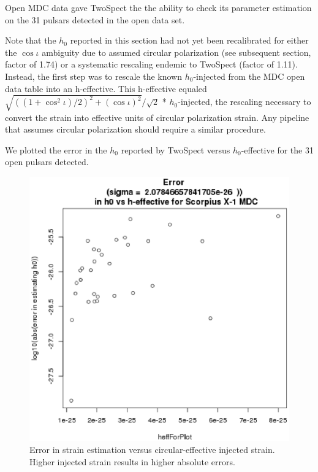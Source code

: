 Open MDC data gave TwoSpect the the ability to check its parameter estimation on the 31 pulsars detected in the open data set.

Note that the $h_0$ reported in this section had not yet been recalibrated for either the $\cos \iota$ ambiguity due to assumed circular polarization (see subsequent section, factor of 1.74) or a systematic rescaling endemic to TwoSpect (factor of 1.11). Instead, the first step was to rescale the known $h_0$-injected from the MDC open data table into an h-effective. This h-effective equaled $\sqrt{ ((1+\cos^2 \iota) / 2)^2 + (\cos \iota)^2 }/\sqrt{2}$ * $h_0$-injected, the rescaling necessary to convert the strain into effective units of circular polarization strain. Any pipeline that assumes circular polarization should require a similar procedure.

We plotted the error in the $h_0$ reported by TwoSpect versus $h_0$-effective for the 31 open pulsars detected.


\begin{figure}
\begin{center}
\includegraphics[width=0.3\paperwidth,height=0.2\paperheight]{detectedHerrVsHeffective.eps}
\caption{ Error in strain estimation versus circular-effective injected strain. Higher injected strain results in higher absolute errors.
\label{fig:detectedherrvsheffective}} 
\end{center}
\end{figure}


